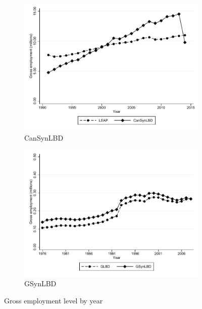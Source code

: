 \begin{figure}
\begin{subfigure}[h]{0.48\linewidth}
\includegraphics[width=\linewidth]{graphs/Gross_employment_level_by_year_private_bw.pdf}
\caption{CanSynLBD}
\end{subfigure}
\hfill
\begin{subfigure}[h]{0.48\linewidth}
\includegraphics[width=\linewidth]{graphs/Gross_employment_level_by_year_bw_GsynLBD.pdf}
\caption{GSynLBD}
\end{subfigure}%
\caption{Gross employment level by year}
\end{figure}



